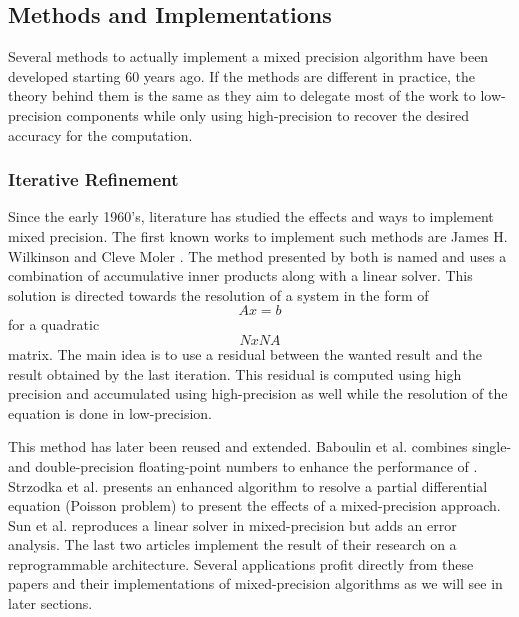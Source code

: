 \subsection{Methods and Implementations}
Several methods to actually implement a mixed precision algorithm have been developed starting 60 years ago. If the methods are different in practice, the theory behind them is the same as they aim to delegate most of the work to low-precision components while only using high-precision to recover the desired accuracy for the computation.
\subsubsection{Iterative Refinement}

Since the early 1960's, literature has studied the effects and ways to implement mixed precision. The first known works to implement such methods are James H. Wilkinson \cite{Wilkinson1994} and Cleve Moler \cite{Moler1957}. The method presented by both is named  and uses a combination of accumulative inner products along with a linear solver. This solution is directed towards the resolution of a system in the form of \begin{equation} Ax=b \end{equation} for a quadratic \begin{equation} NxN A\end{equation} matrix. The main idea is to use a residual between the wanted result and the result obtained by the last iteration. This residual is computed using high precision and accumulated using high-precision as well while the resolution of the equation is done in low-precision.


This method has later been reused and extended. Baboulin et al. \cite{Baboulin2009} combines single- and double-precision floating-point numbers to enhance the performance of . Strzodka et al. \cite{Strzodka2006} presents an enhanced algorithm to resolve a partial differential equation (Poisson problem) to present the effects of a mixed-precision approach. Sun et al. \cite{Sun2008} reproduces a linear solver in mixed-precision but adds an error analysis. The last two articles implement the result of their research on a reprogrammable architecture. Several applications profit directly from these papers and their implementations of mixed-precision algorithms as we will see in later sections.

